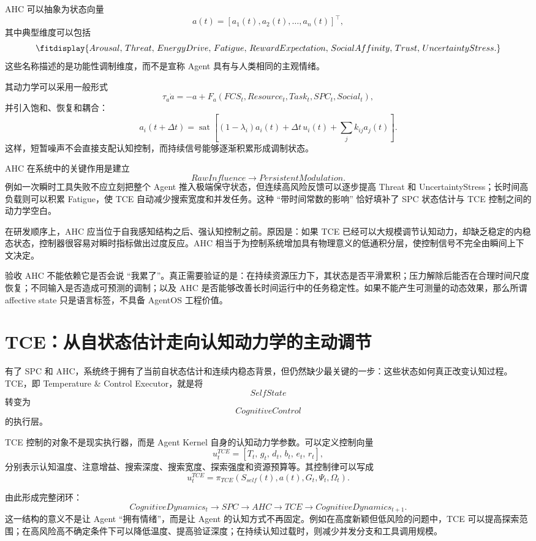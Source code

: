 AHC 可以抽象为状态向量
\[
a(t)
=
[
a_1(t),a_2(t),\ldots,a_n(t)
]^\top,
\]
其中典型维度可以包括
\[
\fitdisplay{
Arousal,\,
Threat,\,
EnergyDrive,\,
Fatigue,\,
RewardExpectation,\,
SocialAffinity,\,
Trust,\,
UncertaintyStress.
}
\]
这些名称描述的是功能性调制维度，而不是宣称 Agent 具有与人类相同的主观情绪。

其动力学可以采用一般形式
\[
\tau_a\dot a
=
-a
+
F_a(
FCS_t,
Resource_t,
Task_t,
SPC_t,
Social_t
),
\]
并引入饱和、恢复和耦合：
\[
a_i(t+\Delta t)
=
\operatorname{sat}
\left[
(1-\lambda_i)a_i(t)
+
\Delta t\,u_i(t)
+
\sum_j k_{ij}a_j(t)
\right].
\]
这样，短暂噪声不会直接支配认知控制，而持续信号能够逐渐积累形成调制状态。

AHC 在系统中的关键作用是建立
\[
RawInfluence
\rightarrow
PersistentModulation.
\]
例如一次瞬时工具失败不应立刻把整个 Agent 推入极端保守状态，但连续高风险反馈可以逐步提高 Threat 和 UncertaintyStress；长时间高负载则可以积累 Fatigue，使 TCE 自动减少搜索宽度和并发任务。这种 ``带时间常数的影响'' 恰好填补了 SPC 状态估计与 TCE 控制之间的动力学空白。

在研发顺序上，AHC 应当位于自我感知结构之后、强认知控制之前。原因是：如果 TCE 已经可以大规模调节认知动力，却缺乏稳定的内稳态状态，控制器很容易对瞬时指标做出过度反应。AHC 相当于为控制系统增加具有物理意义的低通积分层，使控制信号不完全由瞬间上下文决定。

验收 AHC 不能依赖它是否会说 ``我累了''。真正需要验证的是：在持续资源压力下，其状态是否平滑累积；压力解除后能否在合理时间尺度恢复；不同输入是否造成可预测的调制；以及 AHC 是否能够改善长时间运行中的任务稳定性。如果不能产生可测量的动态效果，那么所谓 affective state 只是语言标签，不具备 AgentOS 工程价值。

\section{TCE：从自状态估计走向认知动力学的主动调节}

有了 SPC 和 AHC，系统终于拥有了当前自状态估计和连续内稳态背景，但仍然缺少最关键的一步：这些状态如何真正改变认知过程。TCE，即 Temperature \& Control Executor，就是将
\[
SelfState
\]
转变为
\[
CognitiveControl
\]
的执行层。

TCE 控制的对象不是现实执行器，而是 Agent Kernel 自身的认知动力学参数。可以定义控制向量
\[
u_t^{TCE}
=
[
T_t,\,
g_t,\,
d_t,\,
b_t,\,
e_t,\,
r_t
],
\]
分别表示认知温度、注意增益、搜索深度、搜索宽度、探索强度和资源预算等。其控制律可以写成
\[
u_t^{TCE}
=
\pi_{TCE}
(
S_{self}(t),
a(t),
G_t,
\Psi_t,
\Omega_t
).
\]

由此形成完整闭环：
\[
CognitiveDynamics_t
\rightarrow
SPC
\rightarrow
AHC
\rightarrow
TCE
\rightarrow
CognitiveDynamics_{t+1}.
\]
这一结构的意义不是让 Agent ``拥有情绪''，而是让 Agent 的认知方式不再固定。例如在高度新颖但低风险的问题中，TCE 可以提高探索范围；在高风险高不确定条件下可以降低温度、提高验证深度；在持续认知过载时，则减少并发分支和工具调用规模。

